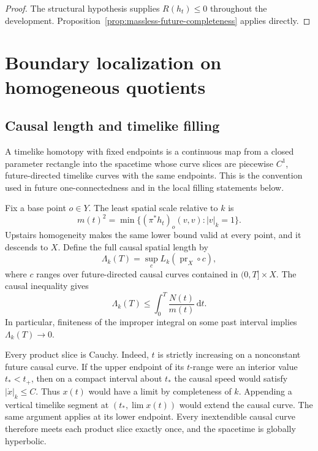 \documentclass[10pt,a4paper]{article}
\numberwithin{equation}{section}
\theoremstyle{definition}
\theoremstyle{remark}
\newcommand{\dd}{\mathrm d}
\begin{document}
\begin{proof}
The structural hypothesis supplies $R(h_t)\le0$ throughout the
development.  Proposition~\ref{prop:massless-future-completeness}
applies directly.
\end{proof}

\section{Boundary localization on homogeneous quotients}
\label{sec:quotient}

\subsection{Causal length and timelike filling}

A timelike homotopy with fixed endpoints is a continuous map from a
closed parameter rectangle into the spacetime whose curve slices are
piecewise $C^1$, future-directed timelike curves with the same endpoints.
This is the convention used in future one-connectedness and in the local
filling statements below.

Fix a base point $o\in Y$.  The least spatial scale relative to $k$ is
\begin{equation}
 m(t)^2=\min\{(\pi^*h_t)_o(v,v): |v|_k=1\}.
 \label{eq:m-def}
\end{equation}
Upstairs homogeneity makes the same lower bound valid at every point, and it
descends to $X$.  Define the full causal spatial length by
\begin{equation}
 \Lambda_k(T)=\sup_c L_k(\operatorname{pr}_X\circ c),
 \label{eq:causal-length}
\end{equation}
where $c$ ranges over future-directed causal curves contained in
$(0,T]\times X$.  The causal inequality gives
\begin{equation}
 \Lambda_k(T)\le \int_0^T\frac{N(t)}{m(t)}\,\dd t.
 \label{eq:causal-length-bound}
\end{equation}
In particular, finiteness of the improper integral on some past interval
implies $\Lambda_k(T)\to0$.

Every product slice is Cauchy.  Indeed, $t$ is strictly increasing on a
nonconstant future causal curve.  If the upper endpoint of its $t$-range
were an interior value $t_*<t_+$, then on a compact interval about $t_*$
the causal speed would satisfy $|\dot x|_k\le C$.  Thus $x(t)$ would have
a limit by completeness of $k$.  Appending a vertical timelike segment at
$(t_*,\lim x(t))$ would extend the causal curve.  The same argument applies
at its lower endpoint.  Every inextendible causal curve therefore meets
each product slice exactly once, and the spacetime is globally hyperbolic.
\end{document}
